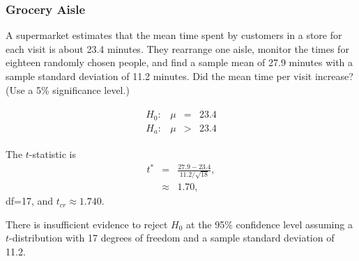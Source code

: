 \begin{frame}
  \frametitle{Grocery Aisle}

  \vspace*{-1em}

  A supermarket estimates that the mean time spent by customers in a
  store for each visit is about 23.4 minutes. They rearrange one
  aisle, monitor the times for eighteen randomly chosen people, and
  find a sample mean of 27.9 minutes with a {\color{red} sample
    standard deviation} of 11.2 minutes. Did the mean time per visit
  increase? (Use a 5\% significance level.)

  \vspace*{-1em}

    \begin{eqnarray*}
      \begin{array}{lrcl}
        H_0: & \mu & = & 23.4 \\
        H_a: & \mu & > & 23.4
      \end{array}
    \end{eqnarray*}

    The $t$-statistic is 
    \begin{eqnarray*}
      t^* & = & \frac{27.9-23.4}{11.2/\sqrt{18}}, \\
      & \approx & 1.70,
    \end{eqnarray*}
    df=17, and $t_{cr}\approx 1.740$.

    \vfill

    {

      {\color{red}
        There is insufficient evidence to reject $H_0$ at the 95\%
        confidence level assuming a $t$-distribution with 17 degrees of
        freedom and a {\color{red}sample standard deviation} of 11.2.
      }

    }

  \end{frame}


